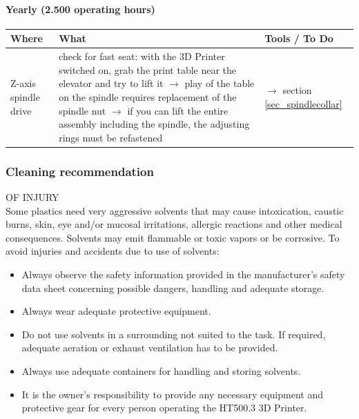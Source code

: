 \paragraph{Yearly (2.500 operating hours)}

\begin{table}[H]
  \centering
  \begin{tabulary}{\textwidth}{ L L L }
    \toprule
    Where             &     	  What                                                   &	 Tools / To Do \\
    \midrule
    Z-axis 
    spindle drive 	  &  check for fast seat:\newline
                         with the 3D Printer switched on, grab the print table near
                         the elevator and try to lift it\newline
                         $\rightarrow$ play of the table on  the spindle requires 
                         replacement of the spindle nut\newline                                  
                         $\rightarrow$ if you can lift the entire assembly including 
                         the spindle, the adjusting rings must be refastened 	         &   $\rightarrow$ section \ref{sec_spindlecollar}  \\
    \bottomrule
  \end{tabulary}
\end{table}

\subsubsection{Cleaning recommendation}

\begin{danger}
   OF INJURY\\
   Some plastics need very aggressive solvents that may cause intoxication, caustic burns, skin, eye and/or mucosal irritations, allergic reactions and other medical consequences. Solvents may emit flammable or toxic vapors or be corrosive.
   To avoid injuries and accidents due to use of solvents:

   \begin{itemize}
      \item Always observe the safety information provided in the manufacturer's safety data sheet concerning
            possible dangers, handling and adequate storage.
      \item Always wear adequate protective equipment.
      \item Do not use solvents in a surrounding not suited to the task. If required, 
            adequate aeration or exhaust ventilation has to be provided.
      \item Always use adequate containers for handling and storing solvents.
      \item It is the owner's responsibility to provide any necessary equipment and protective gear 
            for every person operating the HT500.3 3D Printer.
  \end{itemize}
\end{danger}

